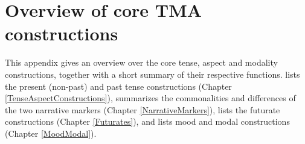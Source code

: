\appendix


\chapter{Overview of core TMA constructions}

This appendix gives an overview over the core tense, aspect and modality constructions, together with a short summary of their respective functions.  lists the present (non-past) and past tense constructions (Chapter \ref{TenseAspectConstructions}),  summarizes the commonalities and differences of the two narrative markers (Chapter \ref{NarrativeMarkers}),  lists the futurate constructions (Chapter \ref{Futurates}), and  lists mood and modal constructions (Chapter \ref{MoodModal}).

